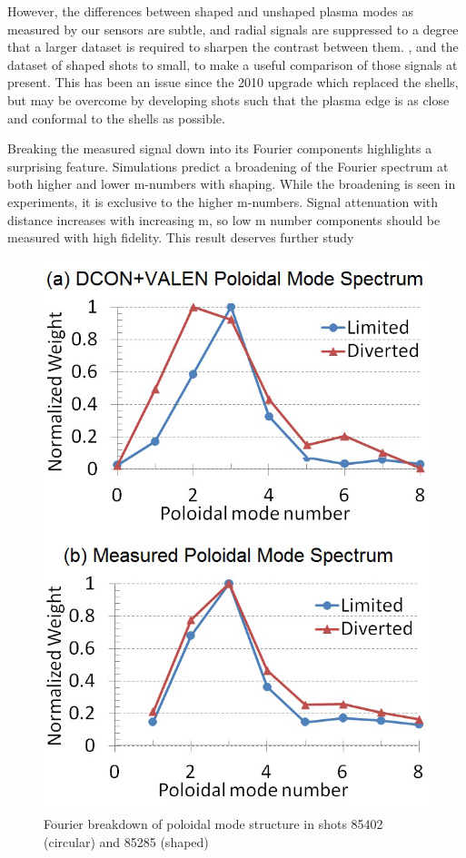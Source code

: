 \documentclass[aps,prl,twocolumn,superscriptaddress,groupedaddress]{revtex4}  %
\begin{document}
However, the differences between shaped and unshaped plasma modes as measured by our sensors are subtle, and radial signals are suppressed to a degree that a larger dataset is required to sharpen the contrast between them. , and the dataset of shaped shots to small, to make a useful comparison of those signals at present.  This has been an issue since the 2010 upgrade which replaced the shells, but may be overcome by developing shots such that the plasma edge is as close and conformal to the shells as possible.\par
	Breaking the measured signal down into its Fourier components highlights a surprising feature.  Simulations predict a broadening of the Fourier spectrum at both higher and lower m-numbers with shaping.  While the broadening is seen in experiments, it is exclusive to the higher m-numbers.  Signal attenuation with distance increases with increasing m, so low m number components should be measured with high fidelity.  This result deserves further study\par
	\begin{figure}[htb]
	\centering
\includegraphics[scale=.5]{../Plots/fig2_mode_spectrum_REV2.png}\caption{Fourier breakdown of poloidal mode structure in shots 85402 (circular) and 85285 (shaped)}
	\label{mike_mode_structure}
	\end{figure}
\end{document}
